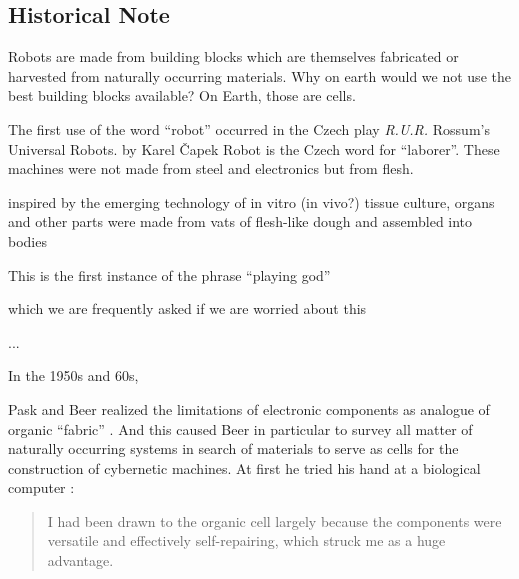 




\subsection{Historical Note}


Robots are made from building blocks which are themselves fabricated or harvested from naturally occurring materials.
Why on earth would we not use the best building blocks available?
On Earth, those are cells.



The first use of the word ``robot'' occurred in the Czech
play \textit{R.U.R.}
Rossum's Universal Robots.
by Karel \v{C}apek
Robot is the Czech word for ``laborer''.
These machines were not made from steel
and electronics
but from flesh.

\cite{ball2020living}

inspired by the emerging technology of 
in vitro (in vivo?) tissue culture,
organs and other parts were made from vats of flesh-like dough and assembled into bodies

This is the first instance of the phrase ``playing god''

which we are frequently asked if we are worried about this

...

In the 1950s and 60s,

Pask and Beer realized the limitations of 
electronic components 
as analogue of organic ``fabric'' \cite{beer1960cybernetics}.
And this caused Beer in particular to survey all matter of naturally occurring systems in search of materials to serve as cells for the construction of cybernetic machines.
At first he tried his hand at a biological computer
\cite{beer1960cybernetics}:
\begin{quote}
\small
I had been drawn to the organic cell largely because the components were versatile and effectively self-repairing, which struck me as a huge advantage.
\end{quote}



